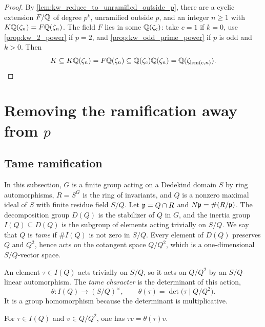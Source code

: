 \begin{proof}
  \leanok
  By \ref{lem:kw_reduce_to_unramified_outside_p}, there are a cyclic extension $F/\mathbb{Q}$ of degree
  $p^k$, unramified outside $p$, and an integer $n \geq 1$ with $K\mathbb{Q}(\zeta_n) = F\mathbb{Q}(\zeta_n)$.
  The field $F$ lies in some $\mathbb{Q}(\zeta_c)$: take $c = 1$ if $k = 0$, use
  \ref{prop:kw_2_power} if $p = 2$, and \ref{prop:kw_odd_prime_power} if $p$ is odd and
  $k > 0$. Then
  \[
    K \subseteq K\mathbb{Q}(\zeta_n) = F\mathbb{Q}(\zeta_n) \subseteq \mathbb{Q}(\zeta_c)\mathbb{Q}(\zeta_n)
      = \mathbb{Q}(\zeta_{\operatorname{lcm}(c,n)}).
  \]
\end{proof}

\section{Removing the ramification away from $p$}

\subsection{Tame ramification}

In this subsection, $G$ is a finite group acting on a Dedekind domain $S$ by ring automorphisms,
$R = S^G$ is the ring of invariants, and $Q$ is a nonzero maximal ideal of $S$ with finite residue
field $S/Q$. Let $\mathfrak{p} = Q \cap R$ and $N\mathfrak{p} = \#(R/\mathfrak{p})$. The decomposition group $D(Q)$ is the
stabilizer of $Q$ in $G$, and the inertia group $I(Q) \subseteq D(Q)$ is the subgroup of elements
acting trivially on $S/Q$. We say that $Q$ is \emph{tame} if $\#I(Q)$ is not zero in $S/Q$.
Every element of $D(Q)$ preserves $Q$ and $Q^2$, hence acts on the cotangent space $Q/Q^2$, which
is a one-dimensional $S/Q$-vector space.

\begin{definition}
  \label{def:tame_character}
  \leanok
  An element $\tau \in I(Q)$ acts trivially on $S/Q$, so it acts on $Q/Q^2$ by an $S/Q$-linear
  automorphism. The \emph{tame character} is the determinant of this action,
  \[
    \theta : I(Q) \to (S/Q)^\times, \qquad \theta(\tau) = \det\big(\tau \mid Q/Q^2\big).
  \]
  It is a group homomorphism because the determinant is multiplicative.
\end{definition}

\begin{lemma}
  \label{lem:tame_character_smul}
  \leanok
  For $\tau \in I(Q)$ and $v \in Q/Q^2$, one has $\tau v = \theta(\tau) v$.
\end{lemma}


